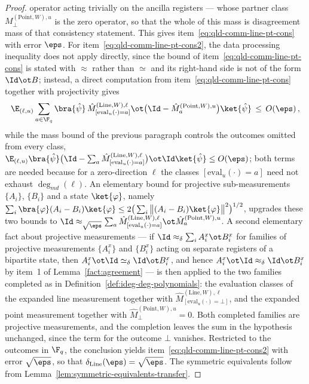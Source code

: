 \begin{proof}
	operator acting trivially on the ancilla registers --- whose partner
	class $M^{(\mathrm{Point},W),u}_{\bot}$ is the zero operator, so that
	the whole of this mass is disagreement mass of that consistency
	statement.
	This gives item~\ref{eq:qld-comm-line-pt-cons} with error $\eps$. For
	item~\ref{eq:qld-comm-line-pt-cons2}, the data processing inequality
	does not apply directly, since the bound of
	item~\ref{eq:qld-comm-line-pt-cons} is stated with $\approx$ rather
	than $\simeq$ and its right-hand side is not of the form
	$\Id \ot B$; instead, a direct computation from
	item~\ref{eq:qld-comm-line-pt-cons} together with projectivity gives
	\[
		\E_{(\ell,u)} \sum_{a \in \F_q}
		\bra{\hat{\psi}}\, \hat{M}^{(\mathrm{Line},W),\ell}_{[\mathrm{eval}_u(\cdot)=a]}
		\ot \big( \Id - \hat{M}^{(\mathrm{Point},W),u}_a \big) \ket{\hat{\psi}}
		\,\leq\, O(\eps)\,,
	\]
	while the mass bound of the previous paragraph controls the outcomes
	omitted from every class,
	$\E_{(\ell,u)} \bra{\hat{\psi}} \big( \Id - \sum_a
	\hat{M}^{(\mathrm{Line},W),\ell}_{[\mathrm{eval}_u(\cdot)=a]} \big)
	\ot \Id \ket{\hat{\psi}} \leq O(\eps)$; both terms are needed because
	for a zero-direction $\ell$ the classes
	$[\mathrm{eval}_u(\cdot)=a]$ need not exhaust $\deg_{md}(\ell)$.
	An elementary bound for projective sub-measurements $\{A_i\}$,
	$\{B_i\}$ and a state $\ket{\varphi}$, namely
	$\sum_i \bra{\varphi}(A_i - B_i)\ket{\varphi} \leq 2 \big( \sum_i \big\|(A_i - B_i)\ket{\varphi}\big\|^2 \big)^{1/2}$,
	upgrades these two bounds to
	$\Id \approx_{\sqrt{\eps}} \sum_a \hat{M}^{(\mathrm{Line},W),\ell}_{[\mathrm{eval}_u(\cdot)=a]} \ot \hat{M}^{(\mathrm{Point},W),u}_a$.
	A second elementary fact about projective measurements --- if
	$\Id \approx_\delta \sum_i A^x_i \ot B^x_i$ for families of projective
	measurements $\{A^x_i\}$ and $\{B^x_i\}$ acting on separate registers
	of a bipartite state, then $A^x_i \ot \Id \simeq_\delta \Id \ot B^x_i$,
	and hence $A^x_i \ot \Id \approx_\delta \Id \ot B^x_i$ by item~1 of
	Lemma~\ref{fact:agreement} --- is then applied to the two families
	completed as in Definition~\ref{def:ideg-deg-polynomials}: the
	evaluation classes of the expanded line measurement together with
	$\hat{M}^{(\mathrm{Line},W),\ell}_{[\mathrm{eval}_u(\cdot)=\bot]}$,
	and the expanded point measurement together with
	$\hat{M}^{(\mathrm{Point},W),u}_{\bot} = 0$. Both completed families
	are projective measurements, and the completion leaves the sum in the
	hypothesis unchanged, since the term for the outcome $\bot$ vanishes.
	Restricted to the outcomes in $\F_q$, the conclusion yields
	item~\ref{eq:qld-comm-line-pt-cons2} with error $\sqrt{\eps}$, so that
	$\delta_{\mathrm{Line}}(\eps) = \sqrt{\eps}$. The symmetric
	equivalents follow from
	Lemma~\ref{lem:symmetric-equivalents-transfer}.


\end{proof}
